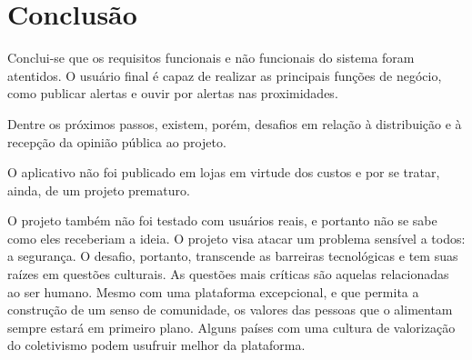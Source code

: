\chapter{Conclusão}
\label{c.conclusao}


Conclui-se que os requisitos funcionais e não funcionais do sistema foram atentidos. O usuário final é capaz de realizar as principais funções de negócio, como publicar alertas e ouvir por alertas nas proximidades.

Dentre os próximos passos, existem, porém, desafios em relação à distribuição e à recepção da opinião pública ao projeto. 

O aplicativo não foi publicado em lojas em virtude dos custos e por se tratar, ainda, de um projeto prematuro.

O projeto também não foi testado com usuários reais, e portanto não se sabe como eles receberiam a ideia. O projeto visa atacar um problema sensível a todos: a segurança. O desafio, portanto, transcende as barreiras tecnológicas e tem suas raízes em questões culturais. As questões mais críticas são aquelas relacionadas ao ser humano. Mesmo com uma plataforma excepcional, e que permita a construção de um senso de comunidade, os valores das pessoas que o alimentam sempre estará em primeiro plano. Alguns países com uma cultura de valorização do coletivismo podem usufruir melhor da plataforma.

